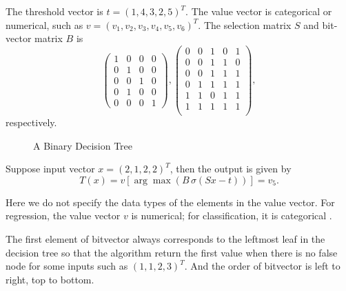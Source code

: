 \documentclass[UTF8]{article}
\begin{document}
The threshold vector is $t=(1,4,3,2,5)^T$.
The value vector is  categorical or numerical,
such as $v=(v_1, v_2, v_3, v_4, v_5, v_6)^T$.
The selection matrix $S$ and  bit-vector matrix $B$ is
$$
\begin{pmatrix}
1 & 0 & 0 & 0\\
0 & 1 & 0 & 0\\
0 & 0 & 1 & 0\\
0 & 1 & 0 & 0\\
0 & 0 & 0 & 1
\end{pmatrix},
\begin{pmatrix}
0 & 0 & 1 & 0 & 1\\
0 & 0 & 1 & 1 & 0\\
0 & 0 & 1 & 1 & 1\\
0 & 1 & 1 & 1 & 1\\
1 & 1 & 0 & 1 & 1\\
1 & 1 & 1 & 1 & 1\\
\end{pmatrix},
$$
respectively.

\begin{figure}[H] %
\centering %

\caption{A Binary Decision Tree} %
\label{Fig.main1} %
\end{figure}


Suppose input vector $x=(2,1,2,2)^T$, then the output is given by
$$T(x)=v[\arg\max(B\,\sigma(Sx-t))]=v_5.$$

Here we do not specify the data types of the elements in the value vector.
For regression, the value vector $v$ is numerical;
for classification, it is categorical \footnotemark.


The first element of bitvector always corresponds to the leftmost leaf in the decision tree
so that the algorithm return the first value when there is no false node for some inputs such as $(1,1,2, 3)^T$.
And the order of bitvector is left to right, top to bottom.
\end{document}
